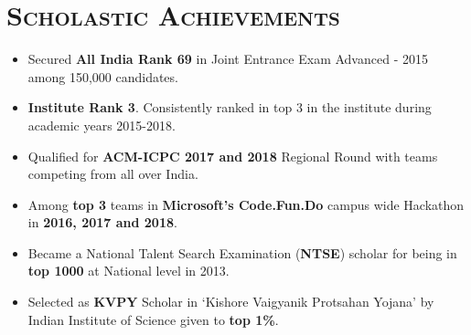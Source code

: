 \documentclass{article}
\newcommand{\tmpsection}[1]{}
\let\tmpsection=\section
\renewcommand{\section}[1]{\tmpsection*{\textsc{#1}}}
\begin{document}
\section{Scholastic Achievements}
\begin{itemize}
    \setlength\itemsep{0.0em}
    \item Secured \textbf{All India Rank 69} in Joint Entrance Exam Advanced - 2015 among 150,000 candidates.
    \item \textbf{Institute Rank 3}. Consistently ranked in top 3 in the institute during academic years 2015-2018.
    \item Qualified for \textbf{ACM-ICPC 2017 and 2018} Regional Round with teams competing from all over India.
    \item Among \textbf{top 3} teams in \textbf{Microsoft's Code.Fun.Do} campus wide Hackathon in \textbf{2016, 2017 and 2018}.
    \item Became a National Talent Search Examination (\textbf{NTSE}) scholar for being in \textbf{top 1000} at National level in 2013.
    \item Selected as \textbf{KVPY} Scholar in `Kishore Vaigyanik Protsahan Yojana' by Indian Institute of Science given to \textbf{top 1\%}.
\end{itemize}
\end{document}
